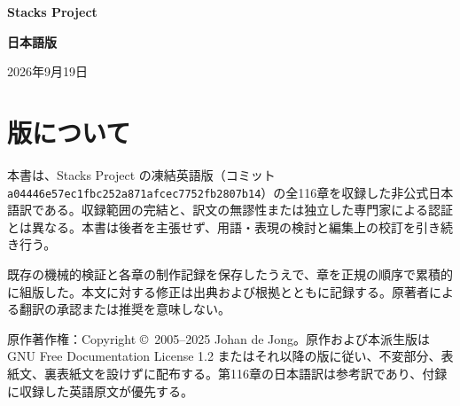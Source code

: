 

\frontmatter
\begin{titlepage}
\thispagestyle{empty}\centering
\vspace*{25mm}
{\fontsize{30}{38}\selectfont\bfseries Stacks Project\par}
\vspace{11mm}
{\fontsize{27}{34}\selectfont\bfseries 日本語版\par}
\vspace{8mm}{\Large 全116章累積版\par}
\vspace{5mm}{\large Japanese Cumulative Edition\par}
\vfill{\large 2026年9月19日\par}
\vspace{4mm}{\small 非公式翻訳。編集上の校訂は継続中。\par}
\end{titlepage}
\chapter*{版について}
本書は、Stacks Project の凍結英語版（コミット \texttt{a04446e57ec1fbc252a871afcec7752fb2807b14}）の全116章を収録した非公式日本語訳である。収録範囲の完結と、訳文の無謬性または独立した専門家による認証とは異なる。本書は後者を主張せず、用語・表現の検討と編集上の校訂を引き続き行う。

既存の機械的検証と各章の制作記録を保存したうえで、章を正規の順序で累積的に組版した。本文に対する修正は出典および根拠とともに記録する。原著者による翻訳の承認または推奨を意味しない。

原作著作権：Copyright \copyright\ 2005--2025 Johan de Jong。原作および本派生版は GNU Free Documentation License 1.2 またはそれ以降の版に従い、不変部分、表紙文、裏表紙文を設けずに配布する。第116章の日本語訳は参考訳であり、付録に収録した英語原文が優先する。

